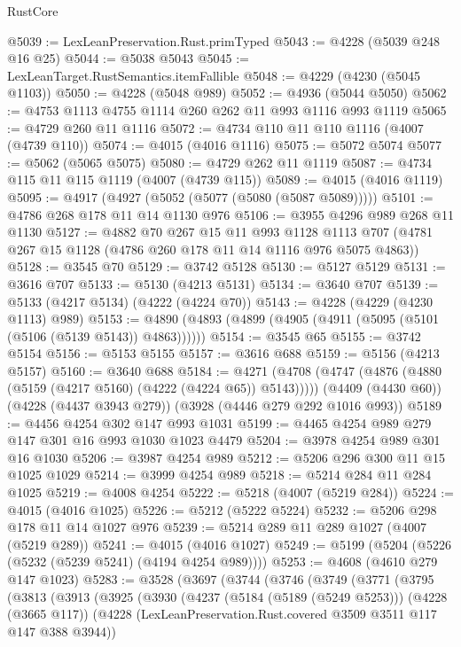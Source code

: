 \begin{lexlean}{RustCore}
\begin{coremodule}
@5039 := LexLeanPreservation.Rust.primTyped
@5043 := @4228 (@5039 @248 @16 @25)
@5044 := @5038 @5043
@5045 := LexLeanTarget.RustSemantics.itemFallible
@5048 := @4229 (@4230 (@5045 @1103))
@5050 := @4228 (@5048 @989)
@5052 := @4936 (@5044 @5050)
@5062 := @4753 @1113 @4755 @1114 @260 @262 @11 @993 @1116 @993 @1119
@5065 := @4729 @260 @11 @1116
@5072 := @4734 @110 @11 @110 @1116 (@4007 (@4739 @110))
@5074 := @4015 (@4016 @1116)
@5075 := @5072 @5074
@5077 := @5062 (@5065 @5075)
@5080 := @4729 @262 @11 @1119
@5087 := @4734 @115 @11 @115 @1119 (@4007 (@4739 @115))
@5089 := @4015 (@4016 @1119)
@5095 := @4917 (@4927 (@5052 (@5077 (@5080 (@5087 @5089)))))
@5101 := @4786 @268 @178 @11 @14 @1130 @976
@5106 := @3955 @4296 @989 @268 @11 @1130
@5127 := @4882
    @70
    @267
    @15
    @11
    @993
    @1128
    @1113
    @707
    (@4781 @267 @15 @1128 (@4786 @260 @178 @11 @14 @1116 @976 @5075 @4863))
@5128 := @3545 @70
@5129 := @3742 @5128
@5130 := @5127 @5129
@5131 := @3616 @707
@5133 := @5130 (@4213 @5131)
@5134 := @3640 @707
@5139 := @5133 (@4217 @5134) (@4222 (@4224 @70))
@5143 := @4228 (@4229 (@4230 @1113) @989)
@5153 := @4890 (@4893 (@4899 (@4905 (@4911 (@5095 (@5101 (@5106 (@5139 @5143)) @4863))))))
@5154 := @3545 @65
@5155 := @3742 @5154
@5156 := @5153 @5155
@5157 := @3616 @688
@5159 := @5156 (@4213 @5157)
@5160 := @3640 @688
@5184 := @4271
    (@4708 (@4747 (@4876 (@4880 (@5159 (@4217 @5160) (@4222 (@4224 @65)) @5143)))))
    (@4409 (@4430 @60))
    (@4228 (@4437 @3943 @279))
    (@3928 (@4446 @279 @292 @1016 @993))
@5189 := @4456 @4254 @302 @147 @993 @1031
@5199 := @4465 @4254 @989 @279 @147 @301 @16 @993 @1030 @1023 @4479
@5204 := @3978 @4254 @989 @301 @16 @1030
@5206 := @3987 @4254 @989
@5212 := @5206 @296 @300 @11 @15 @1025 @1029
@5214 := @3999 @4254 @989
@5218 := @5214 @284 @11 @284 @1025
@5219 := @4008 @4254
@5222 := @5218 (@4007 (@5219 @284))
@5224 := @4015 (@4016 @1025)
@5226 := @5212 (@5222 @5224)
@5232 := @5206 @298 @178 @11 @14 @1027 @976
@5239 := @5214 @289 @11 @289 @1027 (@4007 (@5219 @289))
@5241 := @4015 (@4016 @1027)
@5249 := @5199 (@5204 (@5226 (@5232 (@5239 @5241) (@4194 @4254 @989))))
@5253 := @4608 (@4610 @279 @147 @1023)
@5283 := @3528
    (@3697
      (@3744
        (@3746
          (@3749
            (@3771
              (@3795
                (@3813
                  (@3913
                    (@3925
                      (@3930
                        (@4237
                          (@5184 (@5189 (@5249 @5253)))
                          (@4228 (@3665 @117))
                          (@4228
                            (LexLeanPreservation.Rust.covered @3509 @3511 @117 @147 @388 @3944))

\end{coremodule}
\end{lexlean}
